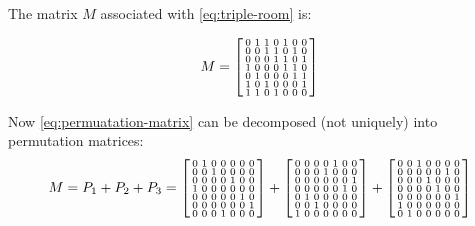 \begin{example}
The matrix $M$ associated with \eqref{eq:triple-room} is:

\begin{equation}
 M = \begin{bsmallmatrix}
    0 & 1 & 1 & 0 & 1 & 0 & 0 \\
    0 & 0 & 1 & 1 & 0 & 1 & 0 \\
    0 & 0 & 0 & 1 & 1 & 0 & 1 \\
    1 & 0 & 0 & 0 & 1 & 1 & 0 \\
    0 & 1 & 0 & 0 & 0 & 1 & 1 \\
    1 & 0 & 1 & 0 & 0 & 0 & 1 \\
    1 & 1 & 0 & 1 & 0 & 0 & 0 \\
  \end{bsmallmatrix}
  \label{eq:permuatation-matrix}
\end{equation}

Now \eqref{eq:permuatation-matrix} can be decomposed (not uniquely) into permutation matrices:
\begin{equation*}
 M = P_1 + P_2 + P_3 = 
  \begin{bsmallmatrix}
    0 & 1 & 0 & 0 & 0 & 0 & 0 \\
    0 & 0 & 1 & 0 & 0 & 0 & 0 \\
    0 & 0 & 0 & 0 & 1 & 0 & 0 \\
    1 & 0 & 0 & 0 & 0 & 0 & 0 \\
    0 & 0 & 0 & 0 & 0 & 1 & 0 \\
    0 & 0 & 0 & 0 & 0 & 0 & 1 \\
    0 & 0 & 0 & 1 & 0 & 0 & 0 \\
  \end{bsmallmatrix}
  +
  \begin{bsmallmatrix}
    0 & 0 & 0 & 0 & 1 & 0 & 0 \\
    0 & 0 & 0 & 1 & 0 & 0 & 0 \\
    0 & 0 & 0 & 0 & 0 & 0 & 1 \\
    0 & 0 & 0 & 0 & 0 & 1 & 0 \\
    0 & 1 & 0 & 0 & 0 & 0 & 0 \\
    0 & 0 & 1 & 0 & 0 & 0 & 0 \\
    1 & 0 & 0 & 0 & 0 & 0 & 0 \\
  \end{bsmallmatrix}
  +
  \begin{bsmallmatrix}
    0 & 0 & 1 & 0 & 0 & 0 & 0 \\
    0 & 0 & 0 & 0 & 0 & 1 & 0 \\
    0 & 0 & 0 & 1 & 0 & 0 & 0 \\
    0 & 0 & 0 & 0 & 1 & 0 & 0 \\
    0 & 0 & 0 & 0 & 0 & 0 & 1 \\
    1 & 0 & 0 & 0 & 0 & 0 & 0 \\
    0 & 1 & 0 & 0 & 0 & 0 & 0 \\
  \end{bsmallmatrix}
\end{equation*}


\end{example}

